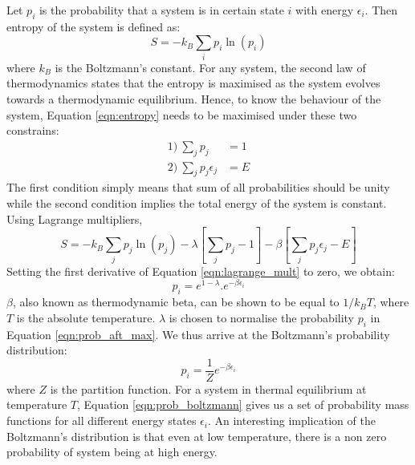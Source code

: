 Let $p_i$ is the probability that a system is in certain state $i$ with energy $\epsilon_i$. Then entropy of the system is defined as:
\begin{equation}
    S = -k_B\sum_{i} p_i \ln(p_i)
    \label{eqn:entropy}
\end{equation}
where $k_B$ is the Boltzmann's constant. For any system, the second law of thermodynamics states that the entropy is maximised as the system evolves towards a  thermodynamic equilibrium. Hence, to know the behaviour of the system, Equation \ref{eqn:entropy} needs to be maximised under these two constrains:
\begin{equation}
    \begin{split}
        1)\ \sum_j p_j &= 1 \\
        2)\ \sum_j p_j \epsilon_j &= E
    \end{split}
\end{equation}
The first condition simply means that sum of all probabilities should be unity while the second condition implies the total energy of the system is constant. Using Lagrange multipliers,  
\begin{equation}
    S = -k_B\sum_j p_j \ln(p_j) - \lambda [\sum_j p_j -1 ] - \beta[\sum_j p_j \epsilon_j - E]
    \label{eqn:lagrange_mult}
\end{equation}
Setting the first derivative of Equation \ref{eqn:lagrange_mult} to zero, we obtain:
\begin{equation}
    p_i = e^{1-\lambda}.e^{-\beta \epsilon_i}
    \label{eqn:prob_aft_max}
\end{equation}
$\beta$, also known as thermodynamic beta, can be shown to be equal to $1/k_B T$, where $T$ is the absolute temperature. $\lambda$ is chosen to normalise the probability $p_i$ in Equation \ref{eqn:prob_aft_max}. We thus arrive at the Boltzmann's probability distribution:
\begin{equation}
    p_i = \frac{1}{Z} e^{-\beta \epsilon_i}
    \label{eqn:prob_boltzmann}
\end{equation}
where $Z$ is the partition function. For a system in thermal equilibrium at temperature $T$, Equation \ref{eqn:prob_boltzmann} gives us a set of probability mass functions for all different energy states $\epsilon_i$. An interesting implication of the Boltzmann's distribution is that even at low temperature, there is a non zero probability of system being at high energy.  


